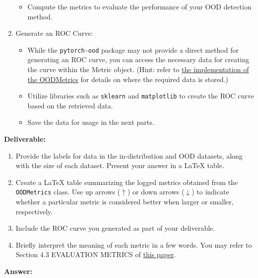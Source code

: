 \documentclass[11pt, oneside]{article}   	%
\begin{document}
\begin{enumerate}
\begin{itemize}
        \item Compute the metrics to evaluate the performance of your OOD detection method.
    \end{itemize}
    \item Generate an ROC Curve:
    \begin{itemize}
        \item While the \texttt{pytorch-ood} package may not provide a direct method for generating an ROC curve, you can access the necessary data for creating the curve within the Metric object. (Hint: refer to \href{https://github.com/kkirchheim/pytorch-ood/blob/dev/src/pytorch_ood/utils/metrics.py#L156-L157}{the implementation of the OODMetrics} for details on where the required data is stored.)
        \item Utilize libraries such as \texttt{sklearn} and \texttt{matplotlib} to create the ROC curve based on the retrieved data. 
        \item Save the data for usage in the next parts.
    \end{itemize}
\end{enumerate}

\textbf{Deliverable:}\\
\begin{enumerate}
    \item Provide the labels for data in the in-distribution and OOD datasets, along with the size of each dataset. Present your answer in a LaTeX table.
    \item Create a LaTeX table summarizing the logged metrics obtained from the \texttt{OODMetrics} class. Use up arrows ($\uparrow$) or down arrows ($\downarrow$) to indicate whether a particular metric is considered better when larger or smaller, respectively.
    \item Include the ROC curve you generated as part of your deliverable. 
    \item Briefly interpret the meaning of each metric in a few words. You may refer to Section 4.3 EVALUATION METRICS of \href{https://arxiv.org/pdf/1706.02690.pdf}{this paper}.
\end{enumerate}

\textbf{Answer:} \\
\end{document}

